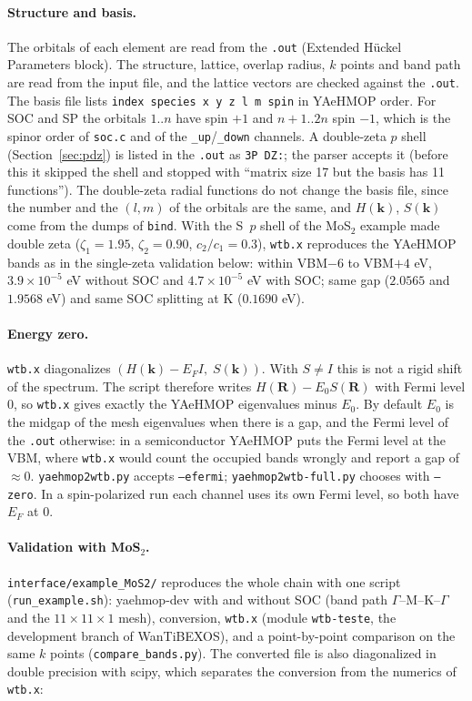 \documentclass[11pt,a4paper]{article}
\newcommand{\file}[1]{\texttt{#1}}
\newcommand{\opt}[1]{\texttt{#1}}
\begin{document}
\paragraph{Structure and basis.} The orbitals of each element are read from the
\texttt{.out} (Extended Hückel Parameters block). The structure, lattice, overlap radius,
$k$ points and band path are read from the input file, and the lattice vectors are checked
against the \texttt{.out}. The basis file lists \texttt{index species x y z l m spin}
in YAeHMOP order. For SOC and SP the orbitals $1..n$ have spin $+1$ and $n+1..2n$ spin
$-1$, which is the spinor order of \file{soc.c} and of the \texttt{\_up}/\texttt{\_down}
channels. A double-zeta $p$ shell (Section~\ref{sec:pdz}) is listed in the \texttt{.out} as
\texttt{3P DZ:}; the parser accepts it (before this it skipped the shell and stopped with
``matrix size 17 but the basis has 11 functions''). The double-zeta radial functions do not
change the basis file, since the number and the $(l,m)$ of the orbitals are the same, and
$H(\mathbf{k})$, $S(\mathbf{k})$ come from the dumps of \texttt{bind}. With the S~$p$ shell of
the MoS$_2$ example made double zeta ($\zeta_1=1.95$, $\zeta_2=0.90$, $c_2/c_1=0.3$),
\texttt{wtb.x} reproduces the YAeHMOP bands as in the single-zeta validation below: within
VBM$-6$ to VBM$+4$ eV, $3.9\times10^{-5}$ eV without SOC and $4.7\times10^{-5}$ eV with SOC;
same gap ($2.0565$ and $1.9568$ eV) and same SOC splitting at K ($0.1690$ eV).

\paragraph{Energy zero.} \texttt{wtb.x} diagonalizes $(H(\mathbf{k})-E_F I,\;S(\mathbf{k}))$.
With $S\neq I$ this is not a rigid shift of the spectrum. The script therefore writes
$H(\mathbf{R})-E_0 S(\mathbf{R})$ with Fermi level 0, so \texttt{wtb.x} gives exactly the
YAeHMOP eigenvalues minus $E_0$. By default $E_0$ is the midgap of the mesh eigenvalues
when there is a gap, and the Fermi level of the \texttt{.out} otherwise: in a semiconductor
YAeHMOP puts the Fermi level at the VBM, where \texttt{wtb.x} would count the occupied bands
wrongly and report a gap of $\approx0$. \file{yaehmop2wtb.py} accepts \opt{--efermi};
\file{yaehmop2wtb-full.py} chooses with \opt{--zero}. In a
spin-polarized run each channel uses its own Fermi level, so both have $E_F$ at 0.

\paragraph{Validation with MoS$_2$.} \file{interface/example\_MoS2/} reproduces the whole
chain with one script (\file{run\_example.sh}): yaehmop-dev with and without SOC (band
path $\Gamma$--M--K--$\Gamma$ and the $11\times11\times1$ mesh), conversion, \texttt{wtb.x}
(module \texttt{wtb-teste}, the development branch of WanTiBEXOS), and a point-by-point
comparison on the same $k$ points (\file{compare\_bands.py}). The converted file is also
diagonalized in double precision with scipy, which separates the conversion from the
numerics of \texttt{wtb.x}:
\end{document}
